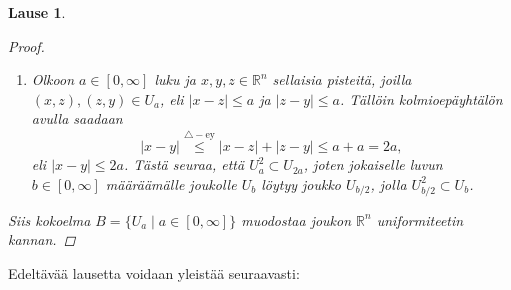 \documentclass[12pt,a4paper,leqno]{report}
\newcommand{\R}{\mathbb{R}}
\theoremstyle{plain}
\newtheorem{lause}[equation]{Lause}
\theoremstyle{definition}
\theoremstyle{remark}
\begin{document}
\begin{lause}
\begin{proof}
\begin{enumerate} [label=(B\arabic*)]
Siis jokaiselle $U_a$ pätee $U_a\subset  U_a^{-1}. $
\item%
Olkoon $a\in[0,\infty]$ luku ja $x,y,z\in\R^n$ sellaisia pisteitä, 
joilla $(x,z),(z,y)\in U_a$, 
eli $|x-z|\leq a$ ja $|z-y|\leq a$.
Tällöin kolmioepäyhtälön avulla saadaan 
$$|x-y|\stackrel{\triangle-\text{ey} }{\leq} |x-z|+|z-y|\leq a+a=2a,$$ 
eli $|x-y|\leq 2a$. Tästä seuraa, että $ U_a^2\subset U_{2a} $, joten jokaiselle luvun $b\in[0,\infty]$ määräämälle joukolle $U_b$ löytyy joukko $U_{b/2}$, jolla $U_{b/2}^2\subset U_b$.
\end{enumerate}
Siis kokoelma $B=\{U_a\mid a\in[0,\infty]\}$ muodostaa joukon $\R^n$ uniformiteetin kannan.
\end{proof}
\end{lause}
\noindent Edeltävää lausetta voidaan yleistää seuraavasti: 
\end{document}
